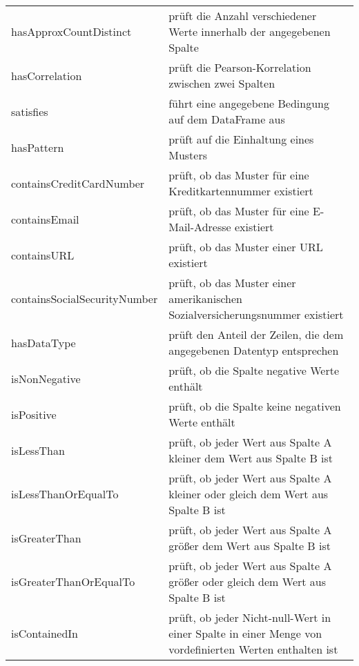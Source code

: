 {\begin{table}
\begin{tabular}{ll}
hasApproxCountDistinct & prüft die Anzahl verschiedener Werte innerhalb der angegebenen Spalte\\
hasCorrelation & prüft die Pearson-Korrelation zwischen zwei Spalten\\
satisfies & führt eine angegebene Bedingung auf dem DataFrame aus\\
hasPattern & prüft auf die Einhaltung eines Musters\\
containsCreditCardNumber & prüft, ob das Muster für eine Kreditkartennummer existiert\\
containsEmail & prüft, ob das Muster für eine E-Mail-Adresse existiert\\
containsURL & prüft, ob das Muster einer URL existiert\\
containsSocialSecurityNumber & prüft, ob das Muster einer amerikanischen Sozialversicherungsnummer existiert\\
hasDataType & prüft den Anteil der Zeilen, die dem angegebenen Datentyp entsprechen\\
isNonNegative & prüft, ob die Spalte negative Werte enthält\\
isPositive & prüft, ob die Spalte keine negativen Werte enthält\\
isLessThan & prüft, ob jeder Wert aus Spalte A kleiner dem Wert aus Spalte B ist\\
isLessThanOrEqualTo & prüft, ob jeder Wert aus Spalte A kleiner oder gleich dem Wert aus Spalte B ist\\
isGreaterThan & prüft, ob jeder Wert aus Spalte A größer dem Wert aus Spalte B ist\\
isGreaterThanOrEqualTo & prüft, ob jeder Wert aus Spalte A größer oder gleich dem Wert aus Spalte B ist\\
isContainedIn & prüft, ob jeder Nicht-null-Wert in einer Spalte in einer Menge von vordefinierten Werten enthalten ist\\
\end{tabular}
\end{table}
}